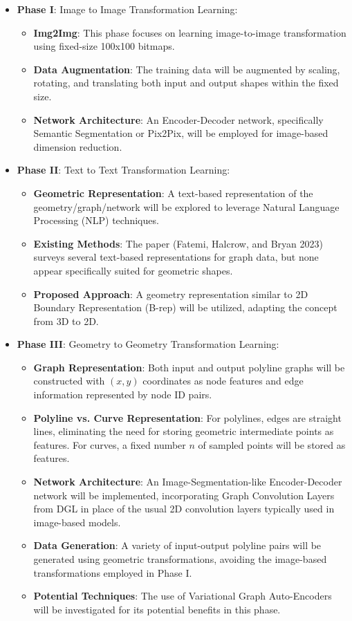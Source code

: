 \documentclass[10pt, conference]{IEEEtran}
\begin{document}
\begin{itemize}
\item {\bf Phase I}: Image to Image Transformation Learning:
	\begin{itemize}
	\item {\bf Img2Img}: This phase focuses on learning image-to-image transformation using fixed-size 100x100 bitmaps.
	\item {\bf Data Augmentation}: The training data will be augmented by scaling, rotating, and translating both input and output shapes within the fixed size.
	\item {\bf Network Architecture}: An Encoder-Decoder network, specifically Semantic Segmentation or Pix2Pix, will be employed for image-based dimension reduction.
	\end{itemize}
	
\item {\bf Phase II}: Text to Text Transformation Learning:
	\begin{itemize}
	\item {\bf Geometric Representation}: A text-based representation of the geometry/graph/network will be explored to leverage Natural Language Processing (NLP) techniques.
	\item {\bf Existing Methods}: The paper (Fatemi, Halcrow, and Bryan 2023) surveys several text-based representations for graph data, but none appear specifically suited for geometric shapes.
	\item {\bf Proposed Approach}: A geometry representation similar to 2D Boundary Representation (B-rep) will be utilized, adapting the concept from 3D to 2D.
	\end{itemize}
		
\item {\bf Phase III}: Geometry to Geometry Transformation Learning:
	\begin{itemize}
	\item {\bf Graph Representation}: Both input and output polyline graphs will be constructed with $(x,y)$ coordinates as node features and edge information represented by node ID pairs.
	\item {\bf Polyline vs. Curve Representation}: For polylines, edges are straight lines, eliminating the need for storing geometric intermediate points as features. For curves, a fixed number $n$ of sampled points will be stored as features.
	\item {\bf Network Architecture}: An Image-Segmentation-like Encoder-Decoder network will be implemented, incorporating Graph Convolution Layers from DGL in place of the usual 2D convolution layers typically used in image-based models.
	\item {\bf Data Generation}: A variety of input-output polyline pairs will be generated using geometric transformations, avoiding the image-based transformations employed in Phase I.
	\item {\bf Potential Techniques}: The use of Variational Graph Auto-Encoders will be investigated for its potential benefits in this phase.
	\end{itemize}
\end{itemize}		
\end{document}
